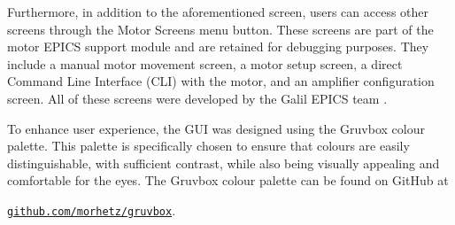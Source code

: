     Furthermore, in addition to the aforementioned screen, users can access other screens through the Motor Screens menu button.
    These screens are part of the motor EPICS support module and are retained for debugging purposes.
    They include a manual motor movement screen, a motor setup screen, a direct Command Line Interface (CLI) with the motor, and an amplifier configuration screen.
    All of these screens were developed by the Galil EPICS team \cite{farnswort2009}.

    To enhance user experience, the GUI was designed using the Gruvbox colour palette.
    This palette is specifically chosen to ensure that colours are easily distinguishable, with sufficient contrast, while also being visually appealing and comfortable for the eyes.
    The Gruvbox colour palette can be found on GitHub at

    \begin{center}
        \hyperlink{github.com/morhetz/gruvbox}{\texttt{github.com/morhetz/gruvbox}}.
    \end{center}
